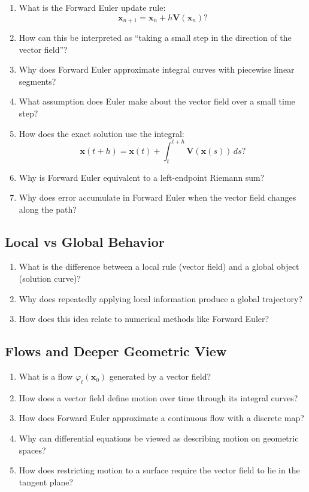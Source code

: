 \begin{enumerate}[resume]
  \item What is the Forward Euler update rule:
    \[
      \mathbf{x}_{n+1} = \mathbf{x}_n + h \mathbf{V}(\mathbf{x}_n) ?
    \]
  \item How can this be interpreted as ``taking a small step in the direction of the vector field''?
  \item Why does Forward Euler approximate integral curves with piecewise linear segments?
  \item What assumption does Euler make about the vector field over a small time step?
  \item How does the exact solution use the integral:
    \[
      \mathbf{x}(t+h) = \mathbf{x}(t) + \int_t^{t+h} \mathbf{V}(\mathbf{x}(s))\,ds ?
    \]
  \item Why is Forward Euler equivalent to a left-endpoint Riemann sum?
  \item Why does error accumulate in Forward Euler when the vector field changes along the path?
\end{enumerate}

\subsection{Local vs Global Behavior}

\begin{enumerate}[resume]
  \item What is the difference between a local rule (vector field) and a global object (solution curve)?
  \item Why does repeatedly applying local information produce a global trajectory?
  \item How does this idea relate to numerical methods like Forward Euler?
\end{enumerate}

\subsection{Flows and Deeper Geometric View}

\begin{enumerate}[resume]
  \item What is a flow $\varphi_t(\mathbf{x}_0)$ generated by a vector field?
  \item How does a vector field define motion over time through its integral curves?
  \item How does Forward Euler approximate a continuous flow with a discrete map?
  \item Why can differential equations be viewed as describing motion on geometric spaces?
  \item How does restricting motion to a surface require the vector field to lie in the tangent plane?
\end{enumerate}
